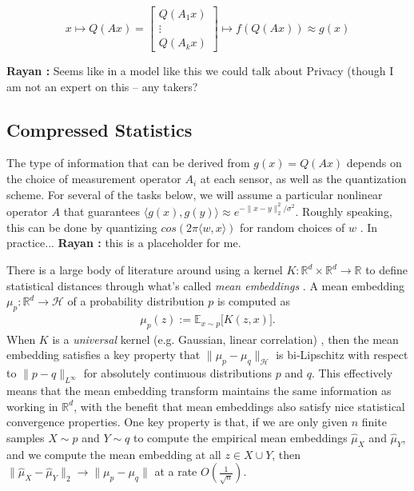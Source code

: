 \documentclass{article}
\newcommand{\comment}[3]{{\color{#1} {\bf #2 :} #3}}
\newcommand{\yoav}[1]{\comment{magenta}{Yoav}{#1}}
\newcommand{\rayan}[1]{\comment{red}{Rayan}{#1}}
\newcommand{\R}{\mathbb{R}}
\begin{document}
\begin{equation}
x 
\mapsto Q(Ax) =\left[ \begin{array}{c} Q(A_1 x) \\ \vdots \\ Q(A_k x) \end{array}\right] \mapsto f(Q(Ax))\approx g(x)
\end{equation}


\rayan{ Seems like in a model like this we could talk about Privacy (though I am not an expert on this -- any takers?} 


\subsection{Compressed Statistics}

The type of information that can be derived from $g(x)=Q(Ax)$ depends on the choice of measurement operator $A_i$ at each sensor, as well as the quantization scheme.  For several of the tasks below, we will assume a particular nonlinear operator $A$ that guarantees $\langle g(x), g(y) \rangle \approx e^{-\|x-y\|_2^2/\sigma^2}$.  Roughly speaking, this can be done by quantizing $cos(2\pi \langle w, x \rangle)$ for random choices of $w$ \cite{rahimi2008random}. In practice... \rayan{this is a placeholder for me.} 

There is a large body of literature around using a kernel $K:\mathbb{R}^d\times \mathbb{R}^d \rightarrow \mathbb{R}$ to define statistical distances through what's called \emph{mean embeddings} \cite{muandet2017kernel}.  A mean embedding $\mu_p:\mathbb{R}^d\rightarrow \mathcal{H}$ of a probability distribution $p$ is computed as
\begin{align*}
    \mu_p(z) := \mathbb{E}_{x\sim p} \big[K(z,x)\big].
\end{align*}
When $K$ is a \emph{universal} kernel (e.g. Gaussian, linear correlation) \cite{micchelli2006universal}, then the mean embedding satisfies a key property that $\|\mu_p - \mu_q\|_\mathcal{H}$ is bi-Lipschitz with respect to $\|p - q\|_{L^{\infty}}$ for absolutely continuous distributions $p$ and $q$.  This effectively means that the mean embedding transform maintains the same information as working in $\R^d$, with the benefit that mean embeddings also satisfy nice statistical convergence properties.  One key property is that, if we are only given $n$ finite samples $X\sim p$ and $Y\sim q$ to compute the empirical mean embeddings $\widehat{\mu}_X$ and $\widehat{\mu}_Y$, and we compute the mean embedding at all $z\in X\cup Y$, then $\|\widehat{\mu}_X - \widehat{\mu}_Y\|_2 \rightarrow \|\mu_p - \mu_q\|$ at a rate $O\left(\frac{1}{\sqrt{n}}\right)$.
\end{document}
